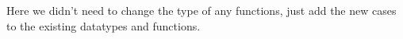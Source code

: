 Here we didn't need to change the type of any functions, just add the new cases to the existing datatypes and functions.


